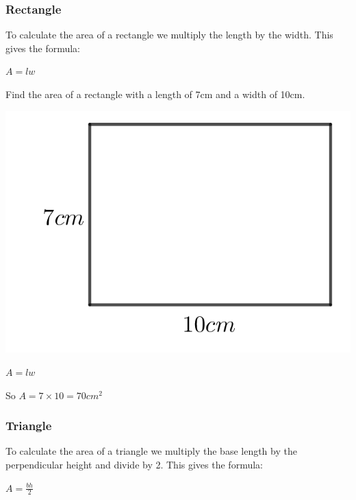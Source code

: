 \subsubsection{Rectangle}
To calculate the area of a rectangle we multiply the length by the width.  This gives the formula:

\bigskip

$A=lw$

\begin{exmp}
	Find the area of a rectangle with a length of 7cm and a width of 10cm.

\bigskip

\includegraphics{./Images/Measurement/AreaEg1.png}

\bigskip

$A=lw$

\bigskip

So $A = 7 \times 10 = 70 cm^2$
\end{exmp}

\subsubsection{Triangle}
To calculate the area of a triangle we multiply the base length by the perpendicular height and divide by 2.  This gives the formula:

\bigskip

$A=\frac{bh}{2}$

